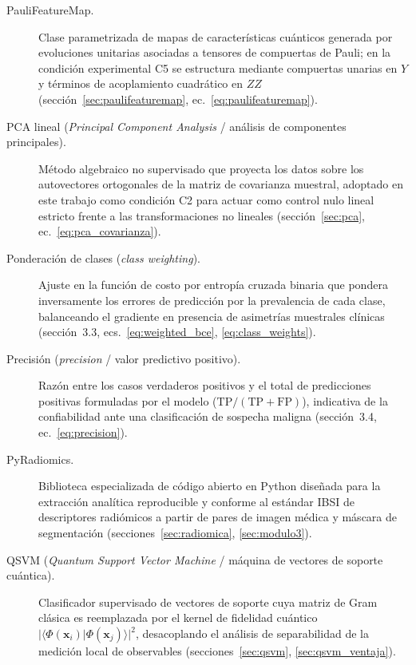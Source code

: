 \begin{description}
  \item[PauliFeatureMap.] Clase parametrizada de mapas de características cuánticos generada por evoluciones unitarias asociadas a tensores de compuertas de Pauli; en la condición experimental C5 se estructura mediante compuertas unarias en $Y$ y términos de acoplamiento cuadrático en $ZZ$ (sección~\ref{sec:paulifeaturemap}, ec.~\ref{eq:paulifeaturemap}).

  \item[PCA lineal (\textit{Principal Component Analysis} / análisis de componentes principales).] Método algebraico no supervisado que proyecta los datos sobre los autovectores ortogonales de la matriz de covarianza muestral, adoptado en este trabajo como condición C2 para actuar como control nulo lineal estricto frente a las transformaciones no lineales (sección~\ref{sec:pca}, ec.~\ref{eq:pca_covarianza}).

  \item[Ponderación de clases (\textit{class weighting}).] Ajuste en la función de costo por entropía cruzada binaria que pondera inversamente los errores de predicción por la prevalencia de cada clase, balanceando el gradiente en presencia de asimetrías muestrales clínicas (sección~3.3, ecs.~\ref{eq:weighted_bce}, \ref{eq:class_weights}).

  \item[Precisión (\textit{precision} / valor predictivo positivo).] Razón entre los casos verdaderos positivos y el total de predicciones positivas formuladas por el modelo ($\mathrm{TP} / (\mathrm{TP} + \mathrm{FP})$), indicativa de la confiabilidad ante una clasificación de sospecha maligna (sección~3.4, ec.~\ref{eq:precision}).

  \item[PyRadiomics.] Biblioteca especializada de código abierto en Python diseñada para la extracción analítica reproducible y conforme al estándar IBSI de descriptores radiómicos a partir de pares de imagen médica y máscara de segmentación (secciones~\ref{sec:radiomica}, \ref{sec:modulo3}).

  \item[QSVM (\textit{Quantum Support Vector Machine} / máquina de vectores de soporte cuántica).] Clasificador supervisado de vectores de soporte cuya matriz de Gram clásica es reemplazada por el kernel de fidelidad cuántico $|\langle \Phi(\mathbf{x}_i)|\Phi(\mathbf{x}_j)\rangle|^2$, desacoplando el análisis de separabilidad de la medición local de observables (secciones~\ref{sec:qsvm}, \ref{sec:qsvm_ventaja}).


\end{description}
